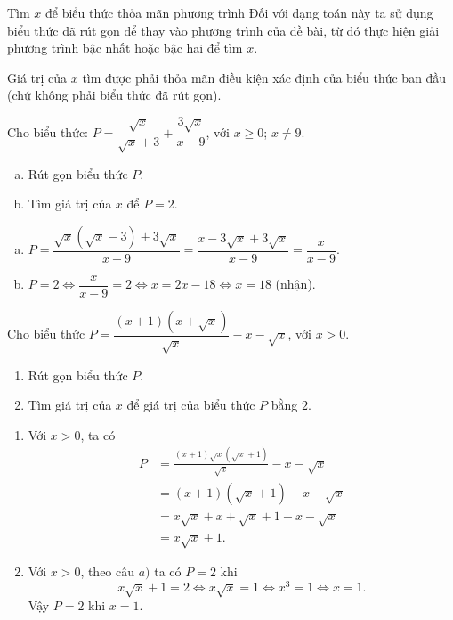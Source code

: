 \begin{dang}{Tìm $x$ để biểu thức thỏa mãn phương trình}
	Đối với dạng toán này ta sử dụng biểu thức đã rút gọn để thay vào phương trình của đề bài, từ đó thực hiện giải phương trình bậc nhất hoặc bậc hai để tìm $x.$
	
	\begin{note}
		Giá trị của $x$ tìm được phải thỏa mãn điều kiện xác định của biểu thức ban đầu (chứ không phải biểu thức đã rút gọn).
	\end{note}
\end{dang}

\begin{vd}
	Cho biểu thức: $P=\dfrac{\sqrt{x}}{\sqrt{x}+3}+\dfrac{3\sqrt{x}}{x-9}$, với $x\geq0$; $x\ne9$.
	\begin{enumerate}[a)]
		\item Rút gọn biểu thức $P$.
		\item Tìm giá trị của $x$ để $P=2$.
	\end{enumerate}
	
	\loigiai
	{
		\begin{enumerate}[a)]
			
			\item $P=\dfrac{\sqrt{x}(\sqrt{x}-3)+3\sqrt{x}}{x-9}=\dfrac{x-3\sqrt{x}+3\sqrt{x}}{x-9}=\dfrac{x}{x-9}$.\\
			\item $P=2\Leftrightarrow \dfrac{x}{x-9}=2\Leftrightarrow x=2x-18\Leftrightarrow x=18$ (nhận).
		\end{enumerate}
	}
\end{vd}
\begin{vd}
	Cho biểu thức $ P = \dfrac{{\left( {x + 1} \right)\left( {x + \sqrt x } \right)}}{{\sqrt x }} - x - \sqrt x$, với $x > 0$.
	\begin{enumerate}
		\item 	Rút gọn biểu thức $P$.
		\item 	Tìm giá trị của $x$ để giá trị của biểu thức $P$ bằng $2$.
	\end{enumerate}
	\loigiai
	{
		\begin{enumerate}
			\item  Với $x > 0$, ta có
				\begin{align*}
				P &= \frac{(x + 1)\sqrt x \left( {\sqrt x  + 1} \right)}{\sqrt x } - x - \sqrt x \\
				&= (x + 1)\left( {\sqrt x  + 1} \right) - x - \sqrt x \\
				&= x\sqrt x  + x + \sqrt x  + 1 - x - \sqrt x \\
				&= x\sqrt x  + 1.
				\end{align*}
			\item Với $x>0$, theo câu $a)$ ta có $P = 2$ khi
			$$x\sqrt x  + 1 = 2 \Leftrightarrow x\sqrt x  = 1
			\Leftrightarrow {x^3} = 1
			\Leftrightarrow x = 1.$$  
			Vậy $P = 2$ khi $x = 1$.
		\end{enumerate}
	}
\end{vd}
